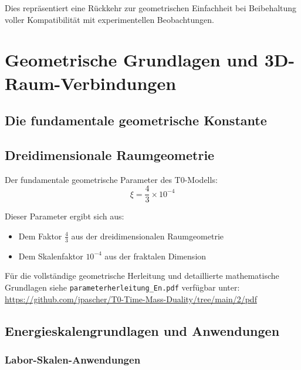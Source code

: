 \documentclass[12pt,a4paper]{report}
\begin{document}
	Dies repräsentiert eine Rückkehr zur geometrischen Einfachheit bei Beibehaltung voller Kompatibilität mit experimentellen Beobachtungen.
	
	\chapter{Geometrische Grundlagen und 3D-Raum-Verbindungen}
	\label{chap:geometric_foundations}
	
	\section{Die fundamentale geometrische Konstante}
	\label{sec:fundamental_geometric_constant}
	



\section{Dreidimensionale Raumgeometrie}
\label{sec:3d_space_geometry}



Der fundamentale geometrische Parameter des T0-Modells:
\begin{equation}
	\xi = \frac{4}{3} \times 10^{-4}
\end{equation}

Dieser Parameter ergibt sich aus:
\begin{itemize}
	\item Dem Faktor $\frac{4}{3}$ aus der dreidimensionalen Raumgeometrie
	\item Dem Skalenfaktor $10^{-4}$ aus der fraktalen Dimension
\end{itemize}

Für die vollständige geometrische Herleitung und detaillierte mathematische Grundlagen 
siehe \texttt{parameterherleitung\_En.pdf} verfügbar unter:
\url{https://github.com/jpascher/T0-Time-Mass-Duality/tree/main/2/pdf}
	\section{Energieskalengrundlagen und Anwendungen}
	\label{sec:energy_foundations}
	
	\subsection{Labor-Skalen-Anwendungen}
	\label{subsec:laboratory_applications}
	
\end{document}
